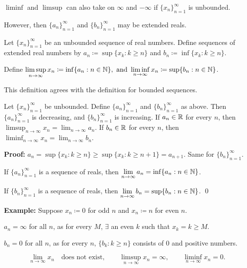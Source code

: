\documentclass[10pt,aspectratio=169]{beamer}
\begin{document}
\begin{frame}

$\liminf$ and $\limsup$ can also take on $\infty$ and $-\infty$
if $\{x_n \}_{n=1}^\infty$ is unbounded.

\pause
However, then $\{ a_n \}_{n=1}^\infty$ and $\{ b_n \}_{n=1}^\infty$ may be extended reals.

\pause
\begin{definition}
Let $\{ x_n \}_{n=1}^\infty$ be an unbounded sequence of real numbers.  Define
sequences of extended real numbers by
$a_n \coloneqq \sup \{ x_k : k \geq n \}$ and
$b_n \coloneqq \inf \{ x_k : k \geq n \}$.

\pause
Define \quad
$\displaystyle
\limsup_{n \to \infty} x_n \coloneqq \inf \{ a_n : n \in {\mathbb{N}} \}, ~\text{and}~
\liminf_{n \to \infty} x_n \coloneqq \sup \{ b_n : n \in {\mathbb{N}} \}$.
\end{definition}

\pause
This definition agrees with the definition for bounded
sequences.

\pause
\begin{proposition}
Let $\{ x_n \}_{n=1}^\infty$ be unbounded.  Define
$\{ a_n \}_{n=1}^\infty$ and $\{ b_n \}_{n=1}^\infty$ as above.
Then $\{ a_n \}_{n=1}^\infty$ is decreasing, and $\{ b_n \}_{n=1}^\infty$ is increasing.
If $a_n \in {\mathbb{R}}$ for every $n$, then
$\displaystyle \limsup_{n\to\infty} x_n = \lim_{n\to\infty} a_n$.
If $b_n \in {\mathbb{R}}$ for every $n$, then
$\displaystyle \liminf_{n\to\infty} x_n = \lim_{n\to\infty} b_n$.
\end{proposition}

\pause
\textbf{Proof:}
$a_n = \sup \{ x_k : k \geq n \} \geq \sup \{ x_k : k \geq n+1 \} =
a_{n+1}$.  Same for $\{ b_n \}_{n=1}^\infty$.

\pause
If $\{ a_n \}_{n=1}^\infty$ is a sequence of reals, then
$\lim\limits_{n\to\infty} a_n = \inf \{ a_n : n \in {\mathbb{N}} \}$.

\pause
If $\{ b_n \}_{n=1}^\infty$ is a sequence of reals, then
$\lim\limits_{n\to\infty} b_n = \sup \{ b_n : n \in {\mathbb{N}} \}$.
\qed

\end{frame}

\begin{frame}

\textbf{Example:}
Suppose
$x_n \coloneqq 0$ for odd $n$ and $x_n \coloneqq n$ for even $n$.

\pause
\medskip

$a_n = \infty$ for all $n$, as for every $M$,
$\exists$ an even $k$ such that $x_k = k \geq M$.

\pause
\medskip

$b_n = 0$ for all $n$, as for every $n$,
$\{ b_k : k \geq n \}$ consists of $0$ and positive numbers.

\pause

\begin{equation*}
\lim_{n\to \infty} x_n \quad \text{does not exist},
\qquad
\limsup_{n\to \infty} x_n = \infty ,
\qquad
\liminf_{n\to \infty} x_n = 0.
\end{equation*}

\end{frame}
\end{document}
